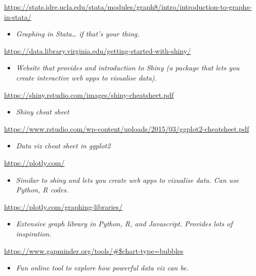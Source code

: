\documentclass[
]{book}
\providecommand{\tightlist}{%
  \setlength{\itemsep}{0pt}\setlength{\parskip}{0pt}}
\begin{document}
\url{https://stats.idre.ucla.edu/stata/modules/graph8/intro/introduction-to-graphs-in-stata/}

\begin{itemize}
\tightlist
\item
  \emph{Graphing in Stata\ldots{} if that's your thing.}
\end{itemize}

\url{https://data.library.virginia.edu/getting-started-with-shiny/}

\begin{itemize}
\tightlist
\item
  \emph{Website that provides and introduction to Shiny (a package that lets you create interactive web apps to visualise data).}
\end{itemize}

\url{https://shiny.rstudio.com/images/shiny-cheatsheet.pdf}

\begin{itemize}
\tightlist
\item
  \emph{Shiny cheat sheet}
\end{itemize}

\url{https://www.rstudio.com/wp-content/uploads/2015/03/ggplot2-cheatsheet.pdf}

\begin{itemize}
\tightlist
\item
  \emph{Data viz cheat sheet in ggplot2}
\end{itemize}

\url{https://plotly.com/}

\begin{itemize}
\tightlist
\item
  \emph{Similar to shiny and lets you create web apps to vizualise data. Can use Python, R codes.}
\end{itemize}

\url{https://plotly.com/graphing-libraries/}

\begin{itemize}
\tightlist
\item
  \emph{Extensive graph library in Python, R, and Javascript. Provides lots of inspiration.}
\end{itemize}

\url{https://www.gapminder.org/tools/\#$chart-type=bubbles}

\begin{itemize}
\tightlist
\item
  \emph{Fun online tool to explore how powerful data viz can be.}
\end{itemize}
\end{document}
